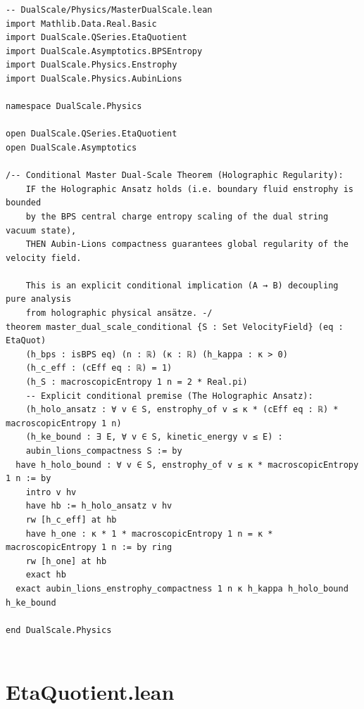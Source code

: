 \documentclass[11pt,twoside,openright]{book}
\begin{document}
\begin{verbatim}
-- DualScale/Physics/MasterDualScale.lean
import Mathlib.Data.Real.Basic
import DualScale.QSeries.EtaQuotient
import DualScale.Asymptotics.BPSEntropy
import DualScale.Physics.Enstrophy
import DualScale.Physics.AubinLions

namespace DualScale.Physics

open DualScale.QSeries.EtaQuotient
open DualScale.Asymptotics

/-- Conditional Master Dual-Scale Theorem (Holographic Regularity):
    IF the Holographic Ansatz holds (i.e. boundary fluid enstrophy is bounded 
    by the BPS central charge entropy scaling of the dual string vacuum state),
    THEN Aubin-Lions compactness guarantees global regularity of the velocity field.
    
    This is an explicit conditional implication (A → B) decoupling pure analysis 
    from holographic physical ansätze. -/
theorem master_dual_scale_conditional {S : Set VelocityField} (eq : EtaQuot)
    (h_bps : isBPS eq) (n : ℝ) (κ : ℝ) (h_kappa : κ > 0)
    (h_c_eff : (cEff eq : ℝ) = 1)
    (h_S : macroscopicEntropy 1 n = 2 * Real.pi)
    -- Explicit conditional premise (The Holographic Ansatz):
    (h_holo_ansatz : ∀ v ∈ S, enstrophy_of v ≤ κ * (cEff eq : ℝ) * macroscopicEntropy 1 n)
    (h_ke_bound : ∃ E, ∀ v ∈ S, kinetic_energy v ≤ E) :
    aubin_lions_compactness S := by
  have h_holo_bound : ∀ v ∈ S, enstrophy_of v ≤ κ * macroscopicEntropy 1 n := by
    intro v hv
    have hb := h_holo_ansatz v hv
    rw [h_c_eff] at hb
    have h_one : κ * 1 * macroscopicEntropy 1 n = κ * macroscopicEntropy 1 n := by ring
    rw [h_one] at hb
    exact hb
  exact aubin_lions_enstrophy_compactness 1 n κ h_kappa h_holo_bound h_ke_bound

end DualScale.Physics


\end{verbatim}

\section{EtaQuotient.lean}
\end{document}
